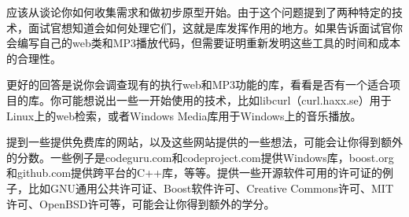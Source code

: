 应该从谈论你如何收集需求和做初步原型开始。由于这个问题提到了两种特定的技术，面试官想知道会如何处理它们，这就是库发挥作用的地方。如果告诉面试官你会编写自己的web类和MP3播放代码，但需要证明重新发明这些工具的时间和成本的合理性。

更好的回答是说你会调查现有的执行web和MP3功能的库，看看是否有一个适合项目的库。你可能想说出一些一开始使用的技术，比如libcurl（curl.haxx.se）用于Linux上的web检索，或者Windows Media库用于Windows上的音乐播放。

提到一些提供免费库的网站，以及这些网站提供的一些想法，可能会让你得到额外的分数。一些例子是codeguru.com和codeproject.com提供Windows库，boost.org和github.com提供跨平台的C++库，等等。提供一些开源软件可用的许可证的例子，比如GNU通用公共许可证、Boost软件许可、Creative Commons许可、MIT许可、OpenBSD许可等，可能会让你得到额外的学分。

